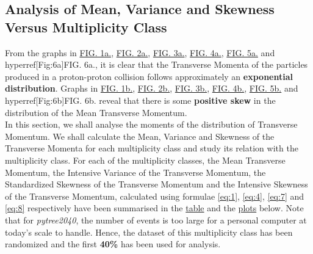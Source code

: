 \documentclass[letterpaper,aps,prc,superscriptaddress,nofootinbib,10pt,showpacs,floatfix]{revtex4-2}%
\begin{document}
\subsection{Analysis of Mean, Variance and Skewness Versus Multiplicity Class}
From the graphs in \hyperref[Fig:1a]{FIG. 1a.}, \hyperref[Fig:2a]{FIG. 2a.}, \hyperref[Fig:3a]{FIG. 3a.}, \hyperref[Fig:4a]{FIG. 4a.}, \hyperref[Fig:5a]{FIG. 5a.} and hyperref[Fig:6a]{FIG. 6a.}, it is clear that the Transverse Momenta of the particles produced in a proton-proton collision follows approximately an \textbf{exponential distribution}. Graphs in \hyperref[Fig:1b]{FIG. 1b.}, \hyperref[Fig:2b]{FIG. 2b.}, \hyperref[Fig:3b]{FIG. 3b.}, \hyperref[Fig:4b]{FIG. 4b.}, \hyperref[Fig:5b]{FIG. 5b.} and hyperref[Fig:6b]{FIG. 6b.} reveal that there is some \textbf{positive skew} in the distribution of the Mean Transverse Momentum.
\\
In this section, we shall analyse the moments of the distribution of Transverse Momentum. We shall calculate the Mean, Variance and Skewness of the Transverse Momenta for each multiplicity class and study its relation with the multiplicity class. For each of the multiplicity classes, the Mean Transverse Momentum, the Intensive Variance of the Transverse Momentum, the Standardized Skewness of the Transverse Momentum and the Intensive Skewness of the Transverse Momentum, calculated using formulae \ref{eq:1}, \ref{eq:4}, \ref{eq:7} and \ref{eq:8} respectively have been summarised in the \hyperref[subsubsec:summary]{table} and the \hyperref[subsubsec:mean]{plots} below. Note that for \textit{pytree2040}, the number of events is too large for a personal computer at today's scale to handle. Hence, the dataset of this multiplicity class has been randomized and the first \textbf{40\%} has been used for analysis.

\pagebreak
\end{document}
